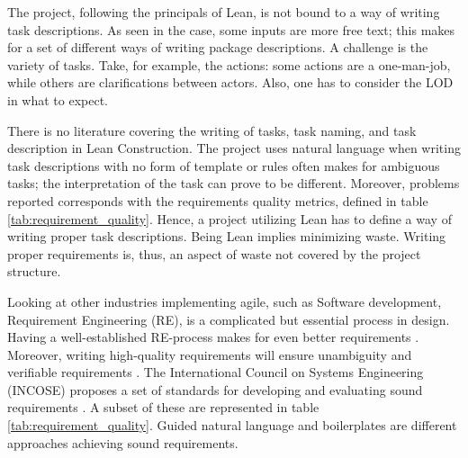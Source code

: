 The project, following the principals of Lean, is not bound to a way of writing task descriptions. As seen in the case, some inputs are more free text; this makes for a set of different ways of writing package descriptions. A challenge is the variety of tasks. Take, for example, the actions: some actions are a one-man-job, while others are clarifications between actors. Also, one has to consider the LOD in what to expect. 

There is no literature covering the writing of tasks, task naming, and task description in Lean Construction. The project uses natural language when writing task descriptions with no form of template or rules often makes for ambiguous tasks; the interpretation of the task can prove to be different. Moreover, problems reported corresponds with the requirements quality metrics, defined in table \ref{tab:requirement_quality}. Hence, a project utilizing Lean has to define a way of writing proper task descriptions. Being Lean implies minimizing waste. Writing proper requirements is, thus, an aspect of waste not covered by the project structure.

Looking at other industries implementing agile, such as Software development, Requirement Engineering (RE), is a complicated but essential process in design. Having a well-established RE-process makes for even better requirements \cite{pandey2010effective}. Moreover, writing high-quality requirements will ensure unambiguity and verifiable requirements \cite{carson2015implementing}. The International Council on Systems Engineering (INCOSE) proposes a set of standards for developing and evaluating sound requirements \cite{incose2015guide}. A subset of these are represented in table \ref{tab:requirement_quality}. Guided natural language \cite{rolland1992natural} and boilerplates \cite{daramola2012pattern} are different approaches achieving sound requirements.

